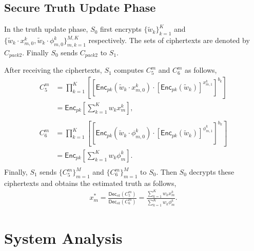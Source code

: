 \documentclass[conference]{IEEEtran}
\begin{document}
\subsection{Secure Truth Update Phase}
In the truth update phase, $S_0$ first encrypts $\{\tilde{w}_k\}_{k=1}^K$ and $\{\tilde{w}_k\cdot x_{m,0}^k, \tilde{w}_k\cdot \phi_{m,0}^k\}_{m,k=1}^{M,K}$ respectively.
The sets of ciphertexts are denoted by $C_{pack2}$.
Finally $S_0$ sends $C_{pack2}$ to $S_1$.

After receiving the ciphertexts, $S_1$ computes $C_5^m$ and $C_6^m$ as follows,
\begin{equation*}
  \begin{split}
    C_5^m & = \prod_{k=1}^K\left[\left[\mathsf{Enc}_{pk}\left(\tilde{w}_k\cdot x_{m,0}^k\right)\cdot \left[\mathsf{Enc}_{pk}\left(\tilde{w}_k\right)\right]^{x_{m,1}^k}\right]^{b_k} \right] \\
    & = \mathsf{Enc}_{pk}\left[\sum_{k=1}^K w_kx_m^k\right] , \\
  \end{split}
\end{equation*}
\begin{equation*}
  \begin{split}
    C_6^m & = \prod_{k=1}^K \left[ \left[ \mathsf{Enc}_{pk}(\tilde{w}_k\cdot \phi_{m,0}^k) \cdot \left[\mathsf{Enc}_{pk}(\tilde{w}_k)\right]^{\phi_{m,1}^k}\right]^{b_k} \right] \\
     & = \mathsf{Enc}_{pk}\left[\sum_{k=1}^K w_k\phi_m^k \right] . \\
  \end{split}
\end{equation*}
Finally, $S_1$ sends $\{C_5^m\}_{m=1}^M$ and $\{C_6^m\}_{m=1}^M$ to $S_0$.
Then $S_0$ decrypts these ciphertexts and obtains the estimated truth as follows,
\begin{equation}
  \begin{split}
    x_m^* = \frac{\mathsf{Dec}_{sk}(C_5^m)}{\mathsf{Dec}_{sk}(C_6^m)} = \frac{\sum_{k=1}^K w_kx_m^k}{\sum_{k=1}^K w_k\phi_m^k} .
  \end{split}
  \label{eq:xm}
\end{equation}

\section{System Analysis}\label{sec6}
\end{document}
